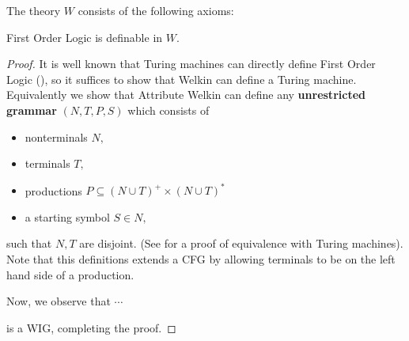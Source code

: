 \begin{itemize}
\begin{definition} The theory $W$ consists of the following axioms:
\end{definition}

\begin{theorem} First Order Logic is definable in $W.$
\end{theorem}
\begin{proof} It is well known that Turing machines can directly define First Order Logic (), so it suffices to show that Welkin can define a Turing machine. Equivalently  we show that Attribute Welkin can define any \textbf{unrestricted grammar} $(N, T, P, S)$ which consists of
\begin{itemize}
  \item nonterminals $N,$
  \item terminals $T,$
  \item productions $P \subseteq (N \cup T)^{+} \times (N \cup T)^{*}$
  \item a starting symbol $S \in N,$
\end{itemize}
such that $N,T$ are disjoint. (See \cite{unrestricted-grammar} for a proof of equivalence with Turing machines). Note that this definitions extends a CFG by allowing terminals to be on the left hand side of a production.

Now, we observe that $\cdots$

is a WIG, completing the proof.
\end{proof}






\end{itemize}
